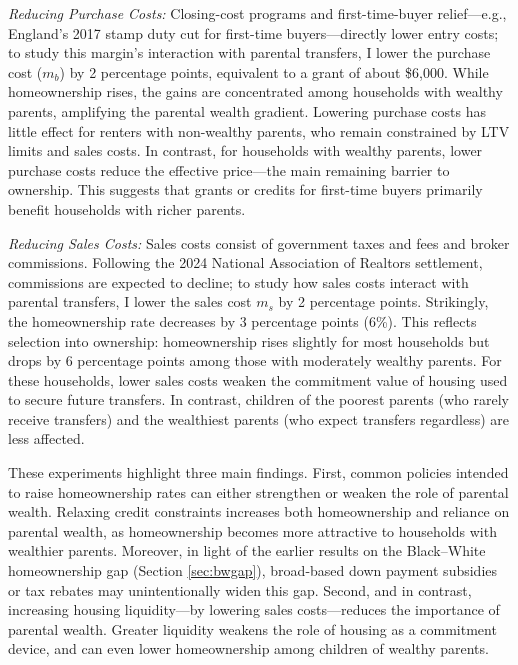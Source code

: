 \documentclass[12pt]{article}
\begin{document}
\textit{Reducing Purchase Costs:}
Closing-cost programs and first-time-buyer relief---e.g., England’s 2017 stamp duty cut for first-time buyers---directly lower entry costs; to study this margin’s interaction with parental transfers, I lower the purchase cost ($m_b$) by 2 percentage points, equivalent to a grant of about \$6,000. While homeownership rises, the gains are concentrated among households with wealthy parents, amplifying the parental wealth gradient. Lowering purchase costs has little effect for renters with non-wealthy parents, who remain constrained by LTV limits and sales costs. In contrast, for households with wealthy parents, lower purchase costs reduce the effective price—the main remaining barrier to ownership. This suggests that grants or credits for first-time buyers primarily benefit households with richer parents.
 
\textit{Reducing Sales Costs:} 
Sales costs consist of government taxes and fees and broker commissions. Following the 2024 National Association of Realtors settlement, commissions are expected to decline; to study how sales costs interact with parental transfers, I lower the sales cost $m_s$ by 2 percentage points. Strikingly, the homeownership rate decreases by 3 percentage points (6\%). This reflects selection into ownership: homeownership rises slightly for most households but drops by 6 percentage points among those with moderately wealthy parents. For these households, lower sales costs weaken the commitment value of housing used to secure future transfers. In contrast, children of the poorest parents (who rarely receive transfers) and the wealthiest parents (who expect transfers regardless) are less affected.


\begin{table}[tb]
	\centering
\end{table}

These experiments highlight three main findings. First, common policies intended to raise homeownership rates can either strengthen or weaken the role of parental wealth. Relaxing credit constraints increases both homeownership and reliance on parental wealth, as homeownership becomes more attractive to households with wealthier parents. Moreover, in light of the earlier results on the Black–White homeownership gap (Section \ref{sec:bwgap}), broad-based down payment subsidies or tax rebates may unintentionally widen this gap. Second, and in contrast, increasing housing liquidity---by lowering sales costs---reduces the importance of parental wealth. Greater liquidity weakens the role of housing as a commitment device, and can even lower homeownership among children of wealthy parents. 
\end{document}
